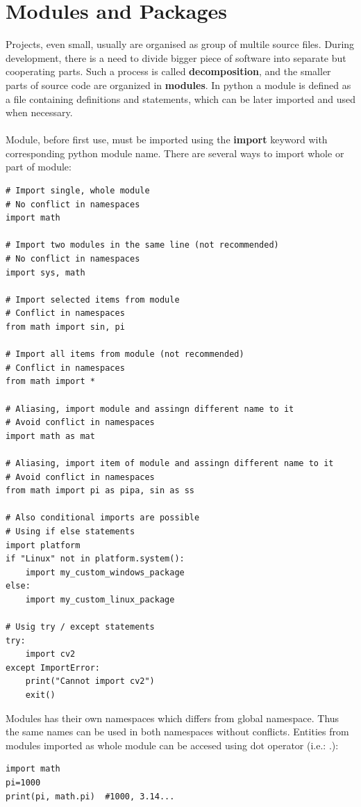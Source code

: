 \documentclass{article}
\begin{document}
\newpage
\section{Modules and Packages}
	Projects, even small, usually are organised as group of multile source files. During development, there is a need to divide bigger piece of software into separate but cooperating parts. Such a process is called \textbf{decomposition}, and the smaller parts of source code are organized in \textbf{modules}.        
In python a module is defined as a file containing definitions and statements, which can be later imported and used when necessary.
\paragraph{}
Module, before first use, must be imported using the \textbf{import} keyword with corresponding python module name. There are several ways to import whole or part of module:
\begin{lstlisting}[style=pystyle]
# Import single, whole module
# No conflict in namespaces
import math

# Import two modules in the same line (not recommended)
# No conflict in namespaces
import sys, math

# Import selected items from module
# Conflict in namespaces
from math import sin, pi

# Import all items from module (not recommended)
# Conflict in namespaces
from math import *

# Aliasing, import module and assingn different name to it
# Avoid conflict in namespaces
import math as mat

# Aliasing, import item of module and assingn different name to it
# Avoid conflict in namespaces
from math import pi as pipa, sin as ss

# Also conditional imports are possible
# Using if else statements
import platform
if "Linux" not in platform.system():
	import my_custom_windows_package
else:
	import my_custom_linux_package

# Usig try / except statements
try:
    import cv2
except ImportError:
    print("Cannot import cv2")
    exit()
\end{lstlisting}
Modules has their own namespaces which differs from global namespace. Thus the same names can be used in both namespaces without conflicts. Entities from modules imported as whole module can be accesed using dot operator (i.e.: .):
\begin{lstlisting}[style=pystyle]
import math
pi=1000
print(pi, math.pi)	#1000, 3.14...
\end{lstlisting}
\end{document}
